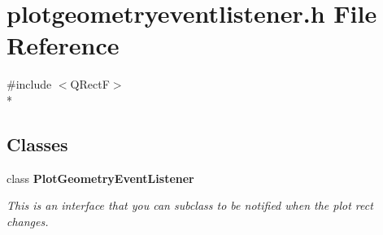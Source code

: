 \section{plotgeometryeventlistener.\+h File Reference}
\label{bk3_2plotgeometryeventlistener_8h}
{\ttfamily \#include $<$Q\+RectF$>$}\\*
\subsection*{Classes}
\begin{DoxyCompactItemize}
\item 
class {\bf Plot\+Geometry\+Event\+Listener}
\begin{DoxyCompactList}\small\item\em This is an interface that you can subclass to be notified when the plot rect changes. \end{DoxyCompactList}\end{DoxyCompactItemize}
